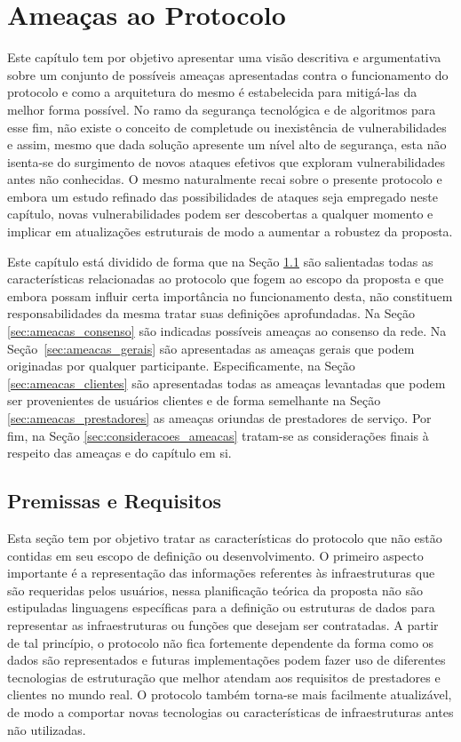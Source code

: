 \chapter{Ameaças ao Protocolo}
\label{ch:ameaças}

Este capítulo tem por objetivo apresentar uma visão descritiva e argumentativa sobre um conjunto de possíveis ameaças apresentadas contra o funcionamento do protocolo e como a arquitetura do mesmo é estabelecida para mitigá-las da melhor forma possível. No ramo da segurança tecnológica e de algoritmos para esse fim, não existe o conceito de completude ou inexistência de vulnerabilidades e assim, mesmo que dada solução apresente um nível alto de segurança, esta não isenta-se do surgimento de novos ataques efetivos que exploram vulnerabilidades antes não conhecidas. O mesmo naturalmente recai sobre o presente protocolo e embora um estudo refinado das possibilidades de ataques seja empregado neste capítulo, novas vulnerabilidades podem ser descobertas a qualquer momento e implicar em atualizações estruturais de modo a aumentar a robustez da proposta.

Este capítulo está dividido de forma que na Seção \ref{sec:premissas_requisitos} são salientadas todas as características relacionadas ao protocolo que fogem ao escopo da proposta e que embora possam influir certa importância no funcionamento desta, não constituem responsabilidades da mesma tratar suas definições aprofundadas. Na Seção \ref{sec:ameacas_consenso} são indicadas possíveis ameaças ao consenso da rede. 
Na Seção~\ref{sec:ameacas_gerais} são apresentadas as ameaças gerais que podem originadas por qualquer participante.
Especificamente, na Seção \ref{sec:ameacas_clientes} são apresentadas todas as ameaças levantadas que podem ser provenientes de usuários clientes e de forma semelhante na Seção \ref{sec:ameacas_prestadores} as ameaças oriundas de prestadores de serviço. Por fim, na Seção \ref{sec:consideracoes_ameacas} tratam-se as considerações finais à respeito das ameaças e do capítulo em si.


\section{Premissas e Requisitos}
\label{sec:premissas_requisitos}

Esta seção tem por objetivo tratar as características do protocolo que não estão contidas em seu escopo de definição ou desenvolvimento. O primeiro aspecto importante é a representação das informações referentes às infraestruturas que são requeridas pelos usuários, nessa planificação teórica da proposta não são estipuladas linguagens específicas para a definição ou estruturas de dados para representar as infraestruturas ou funções que desejam ser contratadas. A partir de tal princípio, o protocolo não fica fortemente dependente da forma como os dados são representados e futuras implementações podem fazer uso de diferentes tecnologias de estruturação que melhor atendam aos requisitos de prestadores e clientes no mundo real. O protocolo também torna-se mais facilmente atualizável, de modo a comportar novas tecnologias ou características de infraestruturas antes não utilizadas.

